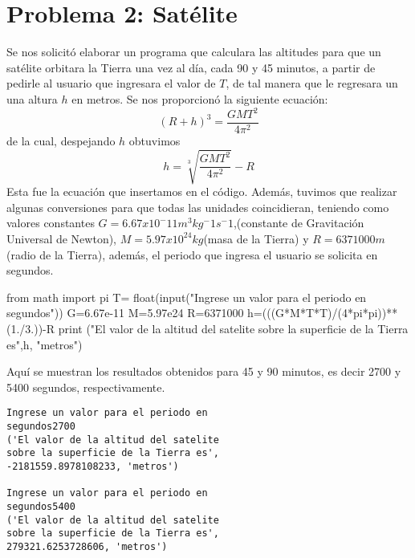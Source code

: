 \documentclass[12 pt,twocolumn]{article}
\begin{document}
\section{\small Problema 2: Satélite}
Se nos solicitó elaborar un programa que calculara las altitudes para que un satélite orbitara la Tierra una vez al día, cada 90 y 45 minutos, a partir de pedirle al usuario que ingresara el valor de $T$, de tal manera que le regresara un una altura $h$ en metros.
Se nos proporcionó la siguiente ecuación: $$(R+h)^3=\frac{GMT^2}{4\pi^2}$$ de la cual, despejando $h$ obtuvimos $$h=\sqrt[3]{\frac{GMT^2}{4\pi^2}} -R $$ Esta fue la ecuación que insertamos en el código. Además, tuvimos que realizar algunas conversiones para que todas las unidades coincidieran, teniendo como valores constantes $G=6.67x10^-11 m^3  kg^-1  s^-1$,(constante de Gravitación Universal de Newton), $M=5.97x10^24 kg$(masa de la Tierra) y $R=6371000 m$ (radio de la Tierra), además, el periodo que ingresa el usuario se solicita en segundos.
\begin{center}
\begin{boxedverbatim}
from math import pi
T= float(input("Ingrese un valor para 
el periodo en segundos"))
G=6.67e-11
M=5.97e24
R=6371000
h=(((G*M*T*T)/(4*pi*pi))**(1./3.))-R
print ("El valor de la altitud del 
satelite sobre la superficie de la 
Tierra es",h, "metros")
\end{boxedverbatim}
\end{center}
Aquí se muestran los resultados obtenidos para 45 y 90 minutos, es decir 2700 y 5400 segundos, respectivamente.
\begin{verbatim}
Ingrese un valor para el periodo en
segundos2700
('El valor de la altitud del satelite 
sobre la superficie de la Tierra es',
-2181559.8978108233, 'metros')

Ingrese un valor para el periodo en 
segundos5400
('El valor de la altitud del satelite
sobre la superficie de la Tierra es',
279321.6253728606, 'metros')

\end{verbatim}
\end{document}
